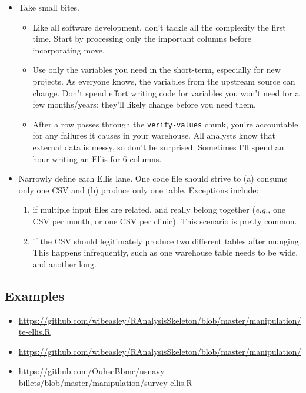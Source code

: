 \documentclass[]{book}
\providecommand{\tightlist}{%
  \setlength{\itemsep}{0pt}\setlength{\parskip}{0pt}}
\begin{document}
\begin{itemize}
\tightlist
\item
  Take small bites.

  \begin{itemize}
  \tightlist
  \item
    Like all software development, don't tackle all the complexity the first time. Start by processing only the important columns before incorporating move.
  \item
    Use only the variables you need in the short-term, especially for new projects. As everyone knows, the variables from the upstream source can change. Don't spend effort writing code for variables you won't need for a few months/years; they'll likely change before you need them.
  \item
    After a row passes through the \texttt{verify-values} chunk, you're accountable for any failures it causes in your warehouse. All analysts know that external data is messy, so don't be surprised. Sometimes I'll spend an hour writing an Ellis for 6 columns.
  \end{itemize}
\item
  Narrowly define each Ellis lane. One code file should strive to (a) consume only one CSV and (b) produce only one table. Exceptions include:

  \begin{enumerate}
  \def\labelenumi{\arabic{enumi}.}
  \tightlist
  \item
    if multiple input files are related, and really belong together (\emph{e.g.}, one CSV per month, or one CSV per clinic). This scenario is pretty common.
  \item
    if the CSV should legitimately produce two different tables after munging. This happens infrequently, such as one warehouse table needs to be wide, and another long.
  \end{enumerate}
\end{itemize}

\hypertarget{examples}{%
\subsection{Examples}\label{examples}}

\begin{itemize}
\tightlist
\item
  \url{https://github.com/wibeasley/RAnalysisSkeleton/blob/master/manipulation/te-ellis.R}
\item
  \url{https://github.com/wibeasley/RAnalysisSkeleton/blob/master/manipulation/}
\item
  \url{https://github.com/OuhscBbmc/usnavy-billets/blob/master/manipulation/survey-ellis.R}
\end{itemize}
\end{document}
